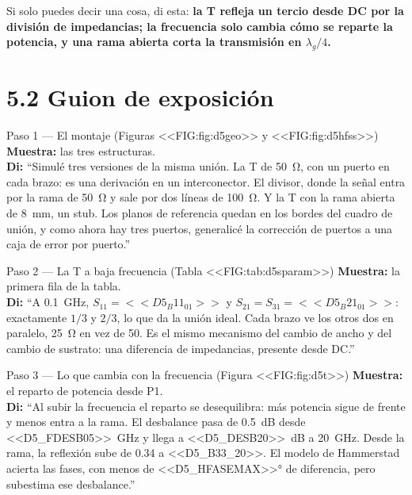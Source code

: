 \documentclass[11pt,letterpaper]{article}
\begin{document}
Si solo puedes decir una cosa, di esta: \textbf{la T refleja un tercio desde DC por la división de impedancias; la frecuencia solo cambia cómo se reparte la potencia, y una rama abierta corta la transmisión en $\lambda_g/4$.}

\section*{5.2 Guion de exposición}

\begin{paso}{Paso 1 --- El montaje (Figuras <<FIG:fig:d5geo>> y <<FIG:fig:d5hfss>>)}
\textbf{Muestra:} las tres estructuras.\\
\textbf{Di:} ``Simulé tres versiones de la misma unión. La T de \SI{50}{\ohm}, con un puerto en cada brazo: es una derivación en un interconector. El divisor, donde la señal entra por la rama de \SI{50}{\ohm} y sale por dos líneas de \SI{100}{\ohm}. Y la T con la rama abierta de \SI{8}{mm}, un stub. Los planos de referencia quedan en los bordes del cuadro de unión, y como ahora hay tres puertos, generalicé la corrección de puertos a una caja de error por puerto.''
\end{paso}

\begin{paso}{Paso 2 --- La T a baja frecuencia (Tabla <<FIG:tab:d5sparam>>)}
\textbf{Muestra:} la primera fila de la tabla.\\
\textbf{Di:} ``A \SI{0.1}{GHz}, $S_{11}=<<D5_B11_01>>$ y $S_{21}=S_{31}=<<D5_B21_01>>$: exactamente $1/3$ y $2/3$, lo que da la unión ideal. Cada brazo ve los otros dos en paralelo, \SI{25}{\ohm} en vez de 50. Es el mismo mecanismo del cambio de ancho y del cambio de sustrato: una diferencia de impedancias, presente desde DC.''
\end{paso}

\begin{paso}{Paso 3 --- Lo que cambia con la frecuencia (Figura <<FIG:fig:d5t>>)}
\textbf{Muestra:} el reparto de potencia desde P1.\\
\textbf{Di:} ``Al subir la frecuencia el reparto se desequilibra: más potencia sigue de frente y menos entra a la rama. El desbalance pasa de \SI{0.5}{dB} desde \SI{<<D5_FDESB05>>}{GHz} y llega a \SI{<<D5_DESB20>>}{dB} a \SI{20}{GHz}. Desde la rama, la reflexión sube de 0.34 a <<D5_B33_20>>. El modelo de Hammerstad acierta las fases, con menos de \ang{<<D5_HFASEMAX>>} de diferencia, pero subestima ese desbalance.''
\end{paso}
\end{document}
